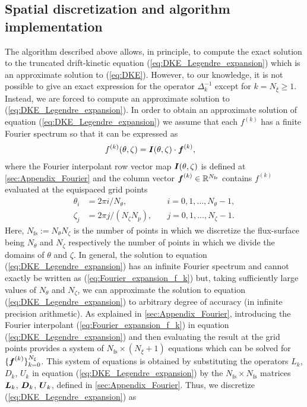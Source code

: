  
 
 \subsection{Spatial discretization and algorithm implementation}\label{subsec:Algorithm_Implementation}
 The algorithm described above allows, in principle, to compute the exact solution to the truncated drift-kinetic equation (\ref{eq:DKE_Legendre_expansion}) which is an approximate solution to (\ref{eq:DKE}). However, to our knowledge, it is not possible to give an exact expression for the operator $\Delta_k^{-1}$ except for $k=N_\xi \ge 1$. Instead, we are forced to compute an approximate solution to (\ref{eq:DKE_Legendre_expansion}).
 In order to obtain an approximate solution of equation (\ref{eq:DKE_Legendre_expansion}) we assume that each $f^{(k)}$ has a finite Fourier spectrum so that it can be expressed as
\begin{align}	
	f^{(k)}(\theta,\zeta)
	& 
	=
	\vb*{I}(\theta,\zeta)
	\cdot
	\vb*{f}^{(k)},
	\label{eq:Fourier_expansion_f_k}
\end{align}
where the Fourier interpolant row vector map $\vb*{I}(\theta,\zeta)$ is defined at \ref{sec:Appendix_Fourier} and the column vector $\vb*{f}^{(k)}\in\mathbb{R}^{N_{\text{fs}}}$
contains $f^{(k)}$ evaluated at the equispaced grid points
%
\begin{align}
	\theta_i & = 2\pi i / N_\theta, \quad & i=0,1,\ldots, N_\theta-1,  \label{eq:Theta_grid}
	\\ 
	\zeta_j & = 2\pi j / (N_\zeta N_p), \quad & j=0,1,\ldots, N_\zeta-1. \label{eq:Zeta_grid}
\end{align}
Here, $N_{\text{fs}}:=N_\theta N_\zeta$ is the number of points in which we discretize the flux-surface being $N_\theta$ and $N_\zeta$ respectively the number of points in which we divide the domains of $\theta$ and $\zeta$. In general, the solution to equation (\ref{eq:DKE_Legendre_expansion}) has an infinite Fourier spectrum and cannot exactly be written as (\ref{eq:Fourier_expansion_f_k}) but, taking sufficiently large values of $N_\theta$ and $N_\zeta$, we can approximate the solution to equation (\ref{eq:DKE_Legendre_expansion}) to arbitrary degree of accuracy (in infinite precision arithmetic). As explained in \ref{sec:Appendix_Fourier}, introducing the Fourier interpolant (\ref{eq:Fourier_expansion_f_k}) in equation (\ref{eq:DKE_Legendre_expansion}) and then evaluating the result at the grid points provides a system of $N_{\text{fs}}\times(N_\xi+1)$ equations which can be solved for $\{\vb*{f}^{(k)}\}_{k=0}^{N_\xi}$. This system of equations is obtained by substituting the operators $L_k$, $D_k$, $U_k$ in equation (\ref{eq:DKE_Legendre_expansion}) by the $N_{\text{fs}}\times N_{\text{fs}}$ matrices $\vb*{L}_k$, $\vb*{D}_k$, $\vb*{U}_k$, defined in \ref{sec:Appendix_Fourier}. Thus, we discretize (\ref{eq:DKE_Legendre_expansion}) as %
